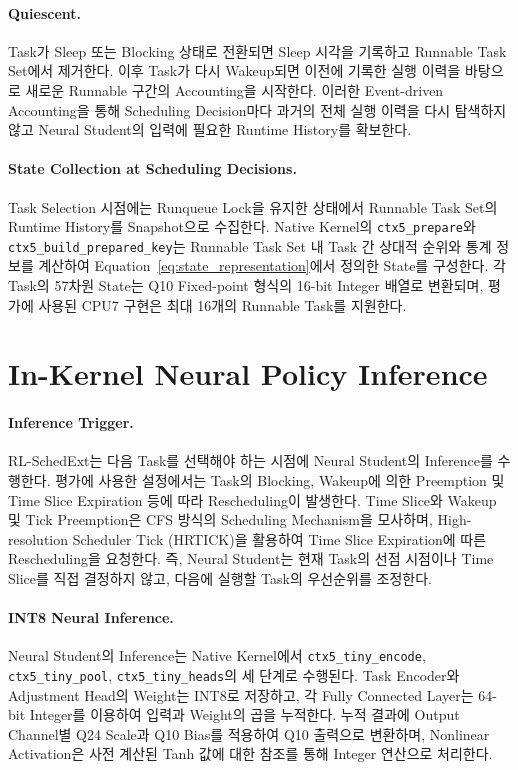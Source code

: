 \paragraph{Quiescent.}
Task가 Sleep 또는 Blocking 상태로 전환되면
Sleep 시각을 기록하고 Runnable Task Set에서 제거한다.
이후 Task가 다시 Wakeup되면 이전에 기록한 실행 이력을
바탕으로 새로운 Runnable 구간의 Accounting을 시작한다.
이러한 Event-driven Accounting을 통해 Scheduling Decision마다
과거의 전체 실행 이력을 다시 탐색하지 않고
Neural Student의 입력에 필요한 Runtime History를 확보한다.


\paragraph{State Collection at Scheduling Decisions.}
Task Selection 시점에는 Runqueue Lock을 유지한 상태에서 Runnable Task Set의 Runtime History를 Snapshot으로 수집한다.
\newline Native Kernel의 \texttt{ctx5\_prepare}와 \texttt{ctx5\_build\_prepared\_key}는 Runnable Task Set 내 Task 간 상대적 순위와 통계 정보를 계산하여 Equation~\ref{eq:state_representation}에서 정의한 State를 구성한다.
각 Task의 57차원 State는 Q10 Fixed-point 형식의 16-bit Integer 배열로 변환되며, 평가에 사용된 CPU7 구현은 최대 16개의 Runnable Task를 지원한다.

\section{In-Kernel Neural Policy Inference}
\label{sec:in_kernel_inference}

\paragraph{Inference Trigger.}
RL-SchedExt는 다음 Task를 선택해야 하는 시점에
Neural Student의 Inference를 수행한다.
평가에 사용한 설정에서는 Task의 Blocking,
Wakeup에 의한 Preemption 및 Time Slice Expiration 등에 따라
Rescheduling이 발생한다.
Time Slice와 Wakeup 및 Tick Preemption은 CFS 방식의
Scheduling Mechanism을 모사하며,
High-resolution Scheduler Tick (HRTICK)을 활용하여
Time Slice Expiration에 따른 Rescheduling을 요청한다.
즉, Neural Student는 현재 Task의 선점 시점이나 Time Slice를
직접 결정하지 않고, 다음에 실행할 Task의 우선순위를 조정한다.

\paragraph{INT8 Neural Inference.}
Neural Student의 Inference는 Native Kernel에서 \texttt{ctx5\_tiny\_encode}, \newline \texttt{ctx5\_tiny\_pool}, \texttt{ctx5\_tiny\_heads}의 세 단계로 수행된다.
Task Encoder와 Adjustment Head의 Weight는 INT8로 저장하고, 각 Fully Connected Layer는 64-bit Integer를 이용하여 입력과 Weight의 곱을 누적한다.
누적 결과에 Output Channel별 Q24 Scale과 Q10 Bias를 적용하여 Q10 출력으로 변환하며, Nonlinear Activation은 사전 계산된 Tanh 값에 대한 참조를 통해 Integer 연산으로 처리한다.


